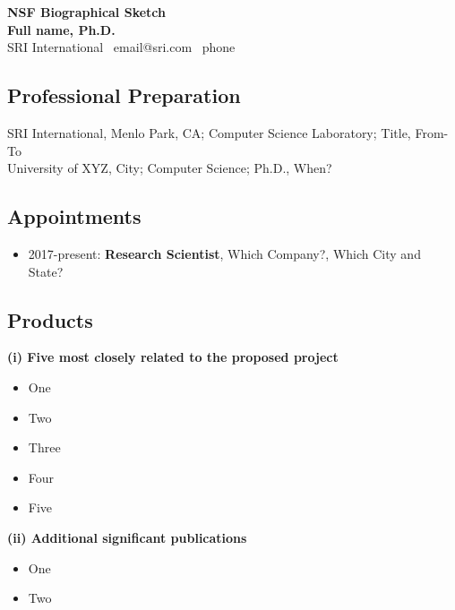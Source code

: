 \begin{center}
  \textbf{NSF Biographical Sketch} \\
  \textbf{Full name, Ph.D.} \\
  SRI International \textbullet\ email@sri.com \textbullet\ phone
  \end{center}
  
  \subsection*{Professional Preparation}
      SRI International, Menlo Park, CA;
          Computer Science Laboratory;
          Title, From-To
          \\
      University of XYZ, City;
          Computer Science;
          Ph.D., When?
  
  \subsection*{Appointments}
  
  \begin{itemize}%
  \item 2017-present:
    \textbf{Research Scientist},
    Which Company?,
    Which City and State?
  \end{itemize}
  
  \subsection*{Products}
  \textbf{(i) Five most closely related to the proposed project}
  
  \begin{itemize}%
  
    \item One
    \item Two
    \item Three
    \item Four
    \item Five \\
  \end{itemize}
  
  \noindent\textbf{(ii) Additional significant publications}
  \begin{itemize}%
  
    \item One
    \item Two
  \end{itemize}
  
